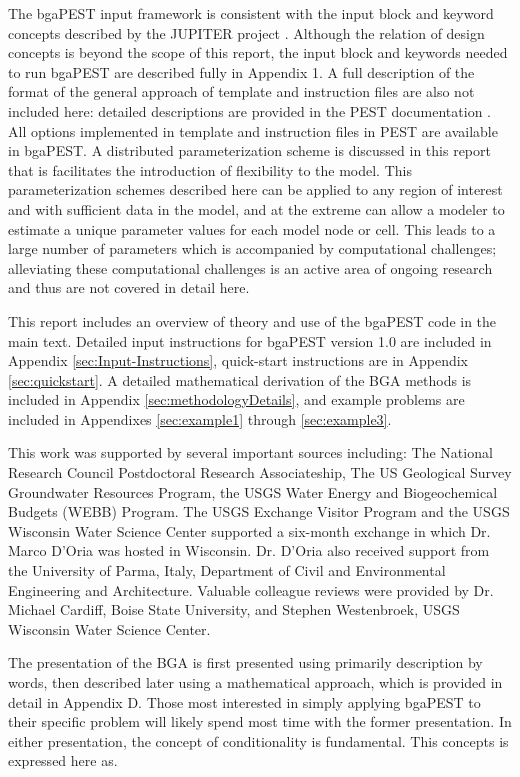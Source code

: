 \documentclass[11pt,oneside,onecolumn]{usgsreport}
\begin{document}
\begin{multicols}{2}
The bgaPEST input framework is consistent with the input block and
keyword concepts described by the JUPITER project \citet{BantaEtAl2006}.
Although the relation of design concepts is beyond the scope of this
report, the input block and keywords needed to run bgaPEST are described
fully in Appendix 1. A full description of the format of the general
approach of template and instruction files are also not included here:
detailed descriptions are provided in the PEST documentation \citep[chapter 3]{PEST}.
All options implemented in template and instruction files in PEST
are available in bgaPEST. A distributed parameterization scheme is
discussed in this report that is facilitates the introduction of 
flexibility to the model. This parameterization schemes described
here can be applied to any region of interest and with sufficient
data in the model, and at the extreme can allow a modeler to estimate
a unique parameter values for each model node or cell. This leads
to a large number of parameters which is accompanied by computational
challenges; alleviating these computational challenges is an active
area of ongoing research and thus are not covered in detail here.

This report includes an overview of theory and use of the bgaPEST
code in the main text. Detailed input instructions for bgaPEST version
1.0 are included in Appendix \ref{sec:Input-Instructions}, quick-start instructions are in Appendix
\ref{sec:quickstart}. A detailed mathematical derivation of the BGA methods is included
in Appendix \ref{sec:methodologyDetails}, and example problems are included in Appendixes \ref{sec:example1} through \ref{sec:example3}. 



This work was supported by several important sources including: The
National Research Council Postdoctoral Research Associateship, The
US Geological Survey Groundwater Resources Program, the USGS Water
Energy and Biogeochemical Budgets (WEBB) Program. The USGS Exchange
Visitor Program and the USGS Wisconsin Water Science Center supported
a six-month exchange in which Dr. Marco D'Oria was hosted in Wisconsin.
Dr. D'Oria also received support from the University of Parma, Italy,
Department of Civil and Environmental Engineering and Architecture.
Valuable colleague reviews were provided by Dr. Michael Cardiff, Boise
State University, and Stephen Westenbroek, USGS Wisconsin Water Science
Center. 

The presentation of the BGA is first presented using primarily description
by words, then described later using a mathematical approach, which
is provided in detail in Appendix D. Those most interested in simply
applying bgaPEST to their specific problem will likely spend most
time with the former presentation. In either presentation,  the concept
of conditionality is fundamental. This concepts is expressed here
as. 


\end{multicols}
\end{document}
